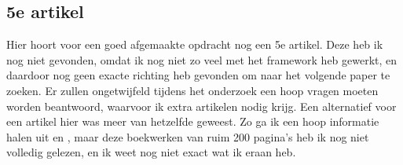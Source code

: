 \documentclass[a4paper,10pt]{article}
\begin{document}
\subsection*{5e artikel}
Hier hoort voor een goed afgemaakte opdracht nog een 5e artikel. Deze heb ik nog
niet gevonden, omdat ik nog niet zo veel met het framework heb gewerkt, en
daardoor nog geen exacte richting heb gevonden om naar het volgende paper te
zoeken. Er zullen ongetwijfeld tijdens het onderzoek een hoop vragen moeten
worden beantwoord, waarvoor ik extra artikelen nodig krijg. Een alternatief voor
een artikel hier was meer van hetzelfde geweest. Zo ga ik een hoop informatie
halen uit \cite{dehoog2011role} en \cite{balch1998behavior}, maar deze
boekwerken van ruim 200 pagina's heb ik nog niet volledig gelezen, en ik weet
nog niet exact wat ik eraan heb.
 

{}

\end{document}

